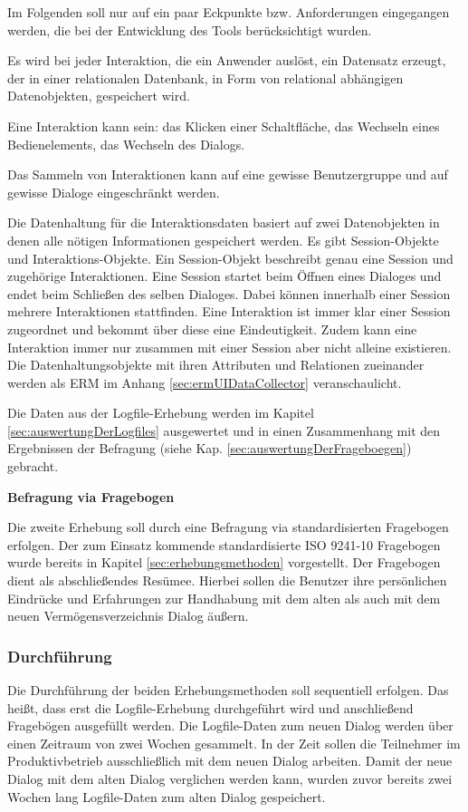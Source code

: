 Im Folgenden soll nur auf ein paar Eckpunkte bzw. Anforderungen eingegangen werden, die bei der Entwicklung des Tools berücksichtigt wurden.
\begin{compactitem}
   \item Es wird bei jeder Interaktion, die ein Anwender auslöst, ein Datensatz erzeugt, der in einer relationalen Datenbank, in Form von relational abhängigen Datenobjekten, gespeichert wird.
   \item Eine Interaktion kann sein: das Klicken einer Schaltfläche, das Wechseln eines Bedienelements, das Wechseln des Dialogs.
   \item Das Sammeln von Interaktionen kann auf eine gewisse Benutzergruppe und auf gewisse Dialoge eingeschränkt werden.
\end{compactitem}

Die Datenhaltung für die Interaktionsdaten basiert auf zwei Datenobjekten in denen alle nötigen Informationen gespeichert werden. Es gibt Session-Objekte und Interaktions-Objekte. Ein Session-Objekt beschreibt genau eine Session und zugehörige Interaktionen. Eine Session startet beim Öffnen eines Dialoges und endet beim Schließen des selben Dialoges. Dabei können innerhalb einer Session mehrere Interaktionen stattfinden. Eine Interaktion ist immer klar einer Session zugeordnet und bekommt über diese eine Eindeutigkeit. Zudem kann eine Interaktion immer nur zusammen mit einer Session aber nicht alleine existieren. Die Datenhaltungsobjekte mit ihren Attributen und Relationen zueinander werden als \gls{ERM} im Anhang \ref{sec:ermUIDataCollector} veranschaulicht.

Die Daten aus der Logfile-Erhebung werden im Kapitel \ref{sec:auswertungDerLogfiles} ausgewertet und in einen Zusammenhang mit den Ergebnissen der Befragung (siehe Kap. \ref{sec:auswertungDerFrageboegen}) gebracht.

\textbf{Befragung via Fragebogen}

Die zweite Erhebung soll durch eine Befragung via standardisierten Fragebogen erfolgen. Der zum Einsatz kommende standardisierte ISO 9241-10 Fragebogen wurde bereits in Kapitel \ref{sec:erhebungsmethoden} vorgestellt. Der Fragebogen dient als abschließendes Resümee. Hierbei sollen die Benutzer ihre persönlichen Eindrücke und Erfahrungen zur Handhabung mit dem alten als auch mit dem neuen Vermögensverzeichnis Dialog äußern.


\subsubsection{Durchführung}
\label{sec:durchfuehrungEvaluation}
Die Durchführung der beiden Erhebungsmethoden soll sequentiell erfolgen. Das heißt, dass erst die Logfile-Erhebung durchgeführt wird und anschließend Fragebögen ausgefüllt werden. Die Logfile-Daten zum neuen Dialog werden über einen Zeitraum von zwei Wochen gesammelt. In der Zeit sollen die Teilnehmer im Produktivbetrieb ausschließlich mit dem neuen Dialog arbeiten. Damit der neue Dialog mit dem alten Dialog verglichen werden kann, wurden zuvor bereits zwei Wochen lang Logfile-Daten zum alten Dialog gespeichert. 

